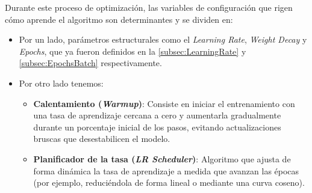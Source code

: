 Durante este proceso de optimización, las variables de configuración que rigen cómo aprende el algoritmo son determinantes y se dividen en:  
\begin{itemize}
    \item Por un lado, parámetros estructurales como el \textit{Learning Rate}, \textit{Weight Decay} y \textit{Epochs}, que ya fueron definidos en la \autoref{subsec:LearningRate} y \autoref{subsec:EpochsBatch} respectivamente. 
    \item Por otro lado tenemos:
    \begin{itemize}
        \item \textbf{Calentamiento (\textit{Warmup})}: Consiste en iniciar el entrenamiento con una tasa de aprendizaje cercana a cero y aumentarla gradualmente durante un porcentaje inicial de los pasos, evitando actualizaciones bruscas que desestabilicen el modelo.
        \item \textbf{Planificador de la tasa (\textit{LR Scheduler})}: Algoritmo que ajusta de forma dinámica la tasa de aprendizaje a medida que avanzan las épocas (por ejemplo, reduciéndola de forma lineal o mediante una curva coseno). 
    \end{itemize}
\end{itemize}

